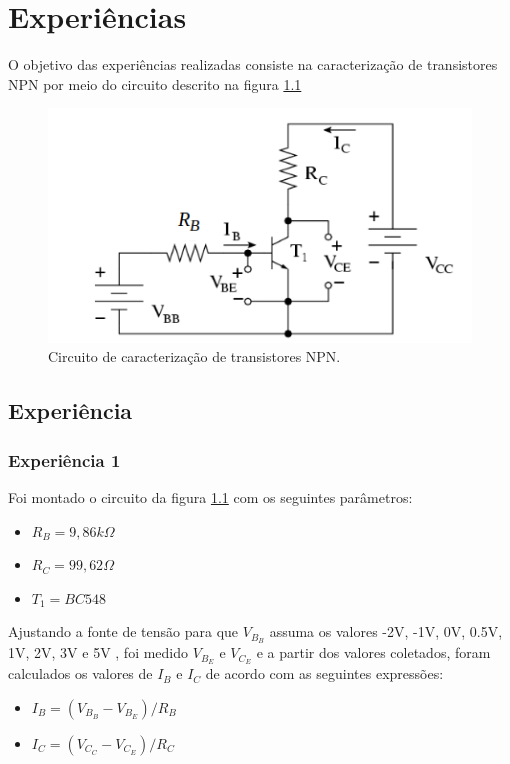 \documentclass{abntex2}
\begin{document}
\imprimircapa
\imprimirfolhaderosto

\tableofcontents
\listoffigures
\listoftables
\clearpage

\chapter{Experiências}

 O objetivo das experiências realizadas consiste na caracterização de transistores NPN
 por meio do circuito descrito na figura
 \ref{fig:circuito}

\begin{figure}[h]
  \centering
  \includegraphics[scale = 0.5]{circuito.png}
  \caption{Circuito de caracterização de transistores NPN.}
  \label{fig:circuito}
\end{figure}


\section{Experiência}
\subsection{Experiência 1}

Foi montado o circuito da figura \ref{fig:circuito} com os seguintes parâmetros:
\begin{itemize}
  \item $R_B = 9,86k\Omega $
  \item $R_C = 99,62\Omega$
  \item $T_1 = BC548$
\end{itemize}

Ajustando a fonte de tensão para que $V_B_B$ assuma os valores -2V, -1V, 0V, 0.5V, 1V, 2V, 3V e 5V
, foi medido $V_B_E$ e $V_C_E$ e a partir dos valores coletados, foram calculados os valores de $I_B$ e $I_C$ de acordo com as seguintes expressões:
\begin{itemize}
  \item $I_B = (V_B_B - V_B_E) / R_B$
  \item $I_C = (V_C_C - V_C_E) / R_C$
\end{itemize}
\end{document}
